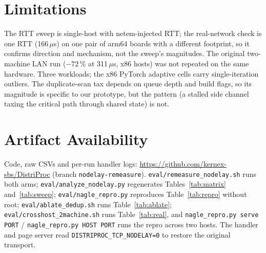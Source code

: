 \documentclass[conference]{IEEEtran}
\newcommand{\us}{\,$\mu$s\xspace}
\begin{document}
\section{Limitations}

The RTT sweep is single-host with netem-injected RTT; the real-network check
is one RTT (166\us) on one pair of arm64 boards with a different footprint, so
it confirms direction and mechanism, not the sweep's magnitudes. The
original two-machine LAN run ($-72\,\%$ at 311\us, x86 hosts) was not
repeated on the same hardware. Three workloads; the x86 PyTorch adaptive
cells carry single-iteration outliers. The duplicate-scan tax depends on queue depth and
build flags, so its magnitude is specific to our prototype, but the pattern
(a stalled side channel taxing the critical path through shared state) is not.

\section{Artifact Availability}

Code, raw CSVs and per-run handler logs:
\url{https://github.com/kernex-sbs/DistriProc} (branch
\texttt{nodelay-remeasure}). \texttt{eval/remeasure\_nodelay.sh} runs both
arms; \texttt{eval/analyze\_nodelay.py} regenerates Tables~\ref{tab:matrix}
and~\ref{tab:sweep}; \texttt{eval/nagle\_repro.py} reproduces
Table~\ref{tab:repro} without root; \texttt{eval/ablate\_dedup.sh} runs
Table~\ref{tab:ablate}; \texttt{eval/crosshost\_2machine.sh} runs
Table~\ref{tab:real}, and \texttt{nagle\_repro.py serve PORT} /
\texttt{nagle\_repro.py HOST PORT} runs the repro across two hosts. The
handler and page server read
\texttt{DISTRIPROC\_TCP\_NODELAY=0} to restore the original transport.



\end{document}
